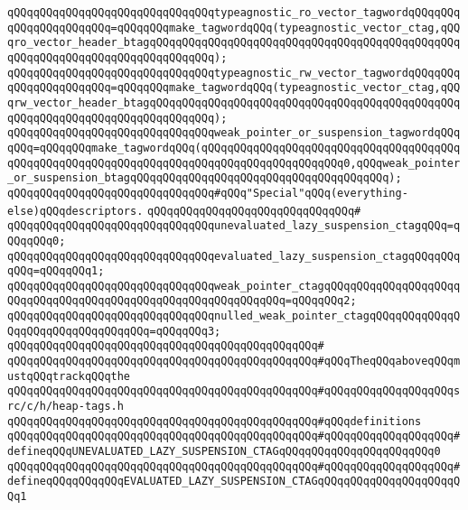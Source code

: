 \verb|qQQqqQQqqQQqqQQqqQQqqQQqqQQqqQQqtypeagnostic_ro_vector_tagwordqQQqqQQqqQQqqQQqqQQqqQQq=qQQqqQQqmake_tagwordqQQq(typeagnostic_vector_ctag,qQQqro_vector_header_btagqQQqqQQqqQQqqQQqqQQqqQQqqQQqqQQqqQQqqQQqqQQqqQQqqQQqqQQqqQQqqQQqqQQqqQQqqQQqqQQq);|\newline
\verb|qQQqqQQqqQQqqQQqqQQqqQQqqQQqqQQqtypeagnostic_rw_vector_tagwordqQQqqQQqqQQqqQQqqQQqqQQq=qQQqqQQqmake_tagwordqQQq(typeagnostic_vector_ctag,qQQqrw_vector_header_btagqQQqqQQqqQQqqQQqqQQqqQQqqQQqqQQqqQQqqQQqqQQqqQQqqQQqqQQqqQQqqQQqqQQqqQQqqQQqqQQq);|\newline
\verb|qQQqqQQqqQQqqQQqqQQqqQQqqQQqqQQqweak_pointer_or_suspension_tagwordqQQqqQQq=qQQqqQQqmake_tagwordqQQq(qQQqqQQqqQQqqQQqqQQqqQQqqQQqqQQqqQQqqQQqqQQqqQQqqQQqqQQqqQQqqQQqqQQqqQQqqQQqqQQqqQQqqQQqqQQq0,qQQqweak_pointer_or_suspension_btagqQQqqQQqqQQqqQQqqQQqqQQqqQQqqQQqqQQqqQQq);|\newline
\newline
\newline
\verb|qQQqqQQqqQQqqQQqqQQqqQQqqQQqqQQq#qQQq"Special"qQQq(everything-else)qQQqdescriptors.|\newline
\verb|qQQqqQQqqQQqqQQqqQQqqQQqqQQqqQQq#|\newline
\verb|qQQqqQQqqQQqqQQqqQQqqQQqqQQqqQQqunevaluated_lazy_suspension_ctagqQQq=qQQqqQQq0;|\newline
\verb|qQQqqQQqqQQqqQQqqQQqqQQqqQQqqQQqevaluated_lazy_suspension_ctagqQQqqQQqqQQq=qQQqqQQq1;|\newline
\verb|qQQqqQQqqQQqqQQqqQQqqQQqqQQqqQQqweak_pointer_ctagqQQqqQQqqQQqqQQqqQQqqQQqqQQqqQQqqQQqqQQqqQQqqQQqqQQqqQQqqQQqqQQq=qQQqqQQq2;|\newline
\verb|qQQqqQQqqQQqqQQqqQQqqQQqqQQqqQQqnulled_weak_pointer_ctagqQQqqQQqqQQqqQQqqQQqqQQqqQQqqQQqqQQq=qQQqqQQq3;|\newline
\verb|qQQqqQQqqQQqqQQqqQQqqQQqqQQqqQQqqQQqqQQqqQQqqQQq#|\newline
\verb|qQQqqQQqqQQqqQQqqQQqqQQqqQQqqQQqqQQqqQQqqQQqqQQq#qQQqTheqQQqaboveqQQqmustqQQqtrackqQQqthe|\newline
\verb|qQQqqQQqqQQqqQQqqQQqqQQqqQQqqQQqqQQqqQQqqQQqqQQq#qQQqqQQqqQQqqQQqqQQqsrc/c/h/heap-tags.h|\newline
\verb|qQQqqQQqqQQqqQQqqQQqqQQqqQQqqQQqqQQqqQQqqQQqqQQq#qQQqdefinitions|\newline
\verb|qQQqqQQqqQQqqQQqqQQqqQQqqQQqqQQqqQQqqQQqqQQqqQQq#qQQqqQQqqQQqqQQqqQQq#defineqQQqUNEVALUATED_LAZY_SUSPENSION_CTAGqQQqqQQqqQQqqQQqqQQqqQQq0|\newline
\verb|qQQqqQQqqQQqqQQqqQQqqQQqqQQqqQQqqQQqqQQqqQQqqQQq#qQQqqQQqqQQqqQQqqQQq#defineqQQqqQQqqQQqEVALUATED_LAZY_SUSPENSION_CTAGqQQqqQQqqQQqqQQqqQQqqQQq1|\newline
